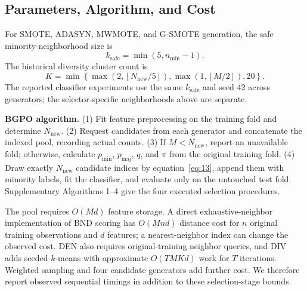 \subsection{Parameters, Algorithm, and Cost}

For SMOTE, ADASYN, MWMOTE, and G-SMOTE generation, the safe minority-neighborhood size is
\begin{equation}\label{eq:14}
k_{\mathrm{safe}}=\min(5,n_{\min}-1).
\end{equation}
The historical diversity cluster count is
\begin{equation}\label{eq:15}
K=\min\left\{\max\!\left(2,\left\lfloor N_{\mathrm{new}}/5\right\rfloor\right),
\max\!\left(1,\left\lfloor M/2\right\rfloor\right),20\right\}.
\end{equation}
The reported classifier experiments use the same \(k_{\mathrm{safe}}\) and seed 42 across generators; the selector-specific neighborhoods above are separate.

\noindent\textbf{BGPO algorithm.} (1) Fit feature preprocessing on the training fold and determine \(N_{\mathrm{new}}\). (2) Request candidates from each generator and concatenate the indexed pool, recording actual counts. (3) If \(M<N_{\mathrm{new}}\), report an unavailable fold; otherwise, calculate \(p_{\min}\), \(p_{\mathrm{maj}}\), \(q\), and \(\pi\) from the original training fold. (4) Draw exactly \(N_{\mathrm{new}}\) candidate indices by equation~\eqref{eq:13}, append them with minority labels, fit the classifier, and evaluate only on the untouched test fold. Supplementary Algorithms 1--4 give the four executed selection procedures.

The pool requires \(O(Md)\) feature storage. A direct exhaustive-neighbor implementation of BND scoring has \(O(Mnd)\) distance cost for \(n\) original training observations and \(d\) features; a nearest-neighbor index can change the observed cost. DEN also requires original-training neighbor queries, and DIV adds seeded \(k\)-means with approximate \(O(TMKd)\) work for \(T\) iterations. Weighted sampling and four candidate generators add further cost. We therefore report observed sequential timings in addition to these selection-stage bounds.
